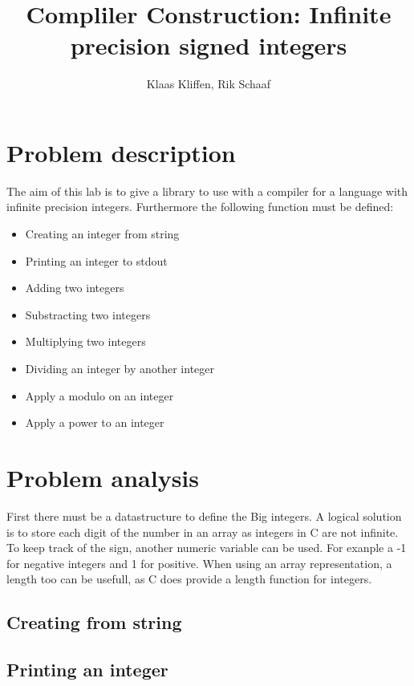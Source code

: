 \documentclass[a4paper,11pt]{article}
\title{Compliler Construction: Infinite precision signed integers }
\author{Klaas Kliffen, Rik Schaaf}
\date{}
\begin{document}

\maketitle


\section{Problem description}
The aim of this lab is to give a library to use with a compiler for a language with infinite precision integers.
Furthermore the following function must be defined:
\begin{itemize}
 \item Creating an integer from string
 \item Printing an integer to stdout
 \item Adding two integers
 \item Substracting two integers
 \item Multiplying two integers
 \item Dividing an integer by another integer
 \item Apply a modulo on an integer
 \item Apply a power to an integer
\end{itemize}

\section{Problem analysis}
First there must be a datastructure to define the Big integers.
A logical solution is to store each digit of the number in an array as integers in C are not infinite.
To keep track of the sign, another numeric variable can be used.
For exanple a -1 for negative integers and 1 for positive.
When using an array representation, a length too can be usefull, as C does provide a length function for integers.
\subsection{Creating from string}

\subsection{Printing an integer}
\end{document}
